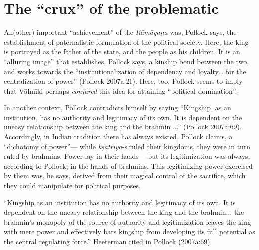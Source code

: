 \section{The “crux” of the problematic}\label{sec1.4}

An(other) important “achievement” of the {\sl Rāmāyaṇa} was, Pollock says, the establishment of paternalistic formulation of the political society. Here, the king is portrayed as the father of the state, and the people as his children. It is an “alluring image” that establishes, Pollock says, a kinship bond between the two, and works towards the “institutionalization of dependency and loyalty… for the centralization of power” (Pollock 2007a:21).  Here, too, Pollock seems to imply that Vālmīki perhaps {\sl conjured} this idea for attaining “political domination”. 

In another context, Pollock contradicts himself by saying “Kingship, as an institution, has no authority and legitimacy of its own. It is dependent on the uneasy relationship between the king and the brahmin ...” (Pollock 2007a:69). Accordingly, in Indian tradition there has always existed, Pollock claims, a “dichotomy of power”--- while {\sl kṣatriya}-s ruled their kingdoms, they were in turn ruled by brahmins.  Power lay in their hands--- but its legitimization was always, according to Pollock, in the hands of brahmins. This legitimizing power exercised by them was, he says, derived from their magical control of the sacrifice, which they could manipulate for political purposes.

\begin{myquote}
“Kingship as an institution has no authority and legitimacy of its own. It is dependent on the uneasy relationship between the king and the brahmin... the brahmin’s monopoly of the source of authority and legitimization leaves the king with mere power and effectively bars kingship from developing its full potential as the central regulating force.” 	
\hfill Heeterman cited in Pollock (2007a:69)
\end{myquote}

